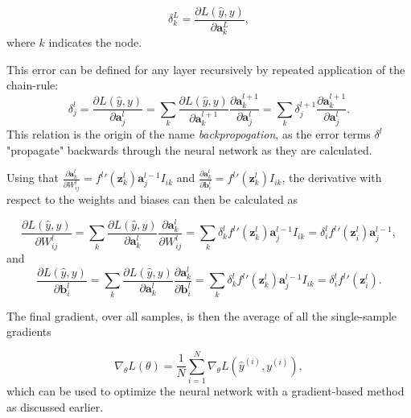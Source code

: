 \begin{equation}\label{eq:lastLayerError}
    \delta^L_k = \frac{\partial L(\hat{y}, y)}{\partial \boldsymbol{a}^L_k},
\end{equation}
where $k$ indicates the node.

This error can be defined for any layer recursively by repeated application of the chain-rule:
\begin{equation}\label{eq:error}
    \delta^l_j = \frac{\partial L(\hat{y}, y)}{\partial \boldsymbol{a}^l_j} 
    = \sum_k \frac{\partial L(\hat{y}, y)}{\partial \boldsymbol{a}^{l+1}_k} \frac{\partial \boldsymbol{a}^{l+1}_k}{\partial \boldsymbol{a}^{l}_j}
    = \sum_k \delta^{l+1}_j \frac{\partial \boldsymbol{a}^{l+1}_k}{\partial \boldsymbol{a}^{l}_j}.
\end{equation}
This relation is the origin of the name \emph{backpropogation}, as the error terms $\delta^l$ "propagate" backwards through the neural network as they are calculated.

Using that 
$\frac{\partial \boldsymbol{a}^{l}_k}{\partial W^l_{ij}} = f^l'(\boldsymbol{z}^{l}_k)\boldsymbol{a}^{l-1}_j I_{ik}$ 
and 
$\frac{\partial \boldsymbol{a}^{l}_k}{\partial \boldsymbol{b}^l_{i}} = f^l'(\boldsymbol{z}^{l}_k) I_{ik}$, the derivative with respect to the weights and biases can then be calculated as 

\begin{equation}\label{eq:derivweights}
    \frac{\partial L(\hat{y}, y)}{\partial W^l_{ij}} = 
    \sum_k \frac{\partial L(\hat{y}, y)}{\partial \boldsymbol{a}^{l}_k} \frac{\partial \boldsymbol{a}^{l}_k}{\partial W^l_{ij}} = 
    \sum_k \delta^{l}_k f^l'(\boldsymbol{z}^{l}_k)\boldsymbol{a}^{l-1}_j I_{ik}=
    \delta^{l}_i f^l'(\boldsymbol{z}^l_i) \boldsymbol{a}^{l-1}_j,
\end{equation}
and
\begin{equation}\label{eq:derivbiases}
    \frac{\partial L(\hat{y}, y)}{\partial \boldsymbol{b}^l_{i}} = 
    \sum_k \frac{\partial L(\hat{y}, y)}{\partial \boldsymbol{a}^{l}_k} \frac{\partial \boldsymbol{a}^{l}_k}{\partial \boldsymbol{b}^l_{i}} = 
    \sum_k \delta^{l}_k f^l'(\boldsymbol{z}^{l}_k)\boldsymbol{a}^{l-1}_j I_{ik}=
    \delta^{l}_i f^l'(\boldsymbol{z}^l_i).
\end{equation}

The final gradient, over all samples, is then the average of all the single-sample gradients

\begin{equation}\label{eq:derivbiases}
    \nabla_\theta L(\theta) = \frac{1}{N}\sum_{i=1}^N \nabla_\theta L(\hat{y}^{(i)}, y^{(i)}),
\end{equation}
which can be used to optimize the neural network with a gradient-based method as discussed earlier.
